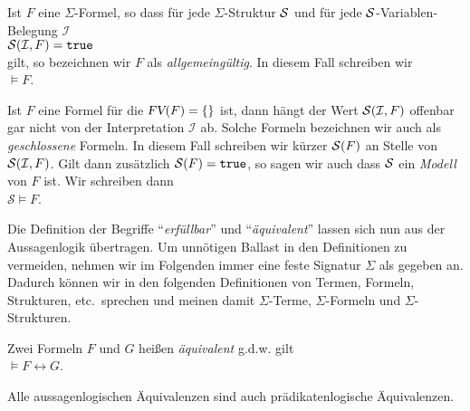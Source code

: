 \begin{Definition}
    Ist $F$ eine $\Sigma$-Formel, so dass f\"{u}r jede $\Sigma$-Struktur $\mathcal{S}$ und f\"{u}r jede
    $\mathcal{S}$-Variablen-Belegung $\mathcal{I}$ \\[0.2cm]
    \hspace*{1.3cm} $\mathcal{S}(\mathcal{I}, F) = \mathtt{true}$ \\[0.2cm]
    gilt, so bezeichnen wir $F$ als {\emph{\color{blue}allgemeing\"{u}ltig}}.  In diesem Fall schreiben wir \\[0.2cm]
    \hspace*{1.3cm} $\models F$. 
    \eox
\end{Definition}

Ist $F$ eine Formel f\"{u}r die $\textsl{FV}(F) = \{\}$ ist, dann h\"{a}ngt der Wert $\mathcal{S}(\mathcal{I}, F)$ 
offenbar gar nicht von der Interpretation $\mathcal{I}$ ab.  Solche Formeln bezeichnen wir auch als 
{\emph{\color{blue}geschlossene}} Formeln.   In diesem Fall schreiben wir k\"{u}rzer  $\mathcal{S}(F)$
an Stelle von $\mathcal{S}(\mathcal{I}, F)$.  Gilt dann zus\"{a}tzlich $\mathcal{S}(F) = \mathtt{true}$, 
so sagen wir auch dass $\mathcal{S}$ ein {\emph{\color{blue}Modell}} von $F$ ist.  Wir schreiben dann \\[0.2cm]
\hspace*{1.3cm} $\mathcal{S} \models F$.
\vspace{0.1cm}

Die Definition der Begriffe ``{\emph{\color{blue}erf\"{u}llbar}}'' und
``{\emph{\color{blue}\"{a}quivalent}}'' lassen sich nun aus der Aussagenlogik \"{u}bertragen. 
Um unn\"{o}tigen Ballast in den Definitionen zu vermeiden, nehmen wir im Folgenden immer eine
feste Signatur $\Sigma$ als gegeben an.  Dadurch k\"{o}nnen wir in den folgenden Definitionen
von Termen, Formeln, Strukturen, etc.~sprechen und meinen damit  $\Sigma$-Terme,
$\Sigma$-Formeln und $\Sigma$-Strukturen.

\begin{Definition}[\"{a}quivalent]
  Zwei Formeln $F$ und $G$ hei\ss{}en {\emph{\color{blue}\"{a}quivalent}} g.d.w. gilt \\[0.2cm]
  \hspace*{1.3cm} $\models F \leftrightarrow G$.
  \eox
\end{Definition}

\noindent
Alle aussagenlogischen \"{A}quivalenzen sind auch pr\"{a}dikatenlogische \"{A}quivalenzen.

